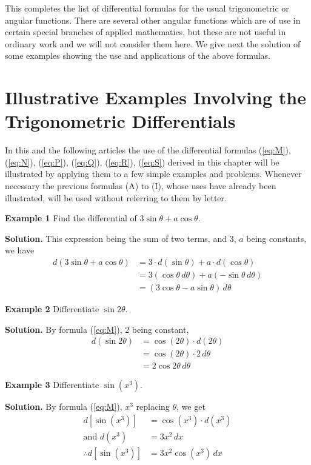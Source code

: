 This completes the list of differential formulas for the usual trigonometric or angular functions. There are several other angular functions which are of use in certain special branches of applied mathematics, but these are not useful in ordinary work and we will not consider them here. We give next the solution of some examples showing the use and applications of the above formulas.

\section{Illustrative Examples Involving the Trigonometric Differentials}

In this and the following articles the use of the differential formulas (\eqref{eq:M}), (\eqref{eq:N}), (\eqref{eq:P}), (\eqref{eq:Q}), (\eqref{eq:R}), (\eqref{eq:S}) derived in this chapter will be illustrated by applying them to a few simple examples and problems. Whenever necessary the previous formulas (A) to (I), whose uses have already been illustrated, will be used without referring to them by letter.

\textbf{Example 1}
Find the differential of $3\sin\theta + a\cos\theta$.

\noindent\textbf{Solution.} This expression being the sum of two terms, and 3, $a$ being constants, we have
\begin{align*}
d(3\sin\theta + a\cos\theta) &= 3\cdot d(\sin\theta) + a\cdot d(\cos\theta) \\
&= 3(\cos\theta\,d\theta) + a(-\sin\theta\,d\theta) \\
&= (3\cos\theta - a\sin\theta)\,d\theta
\end{align*}

\textbf{Example 2}
Differentiate $\sin 2\theta$.

\noindent\textbf{Solution.} By formula (\eqref{eq:M}), 2 being constant,
\begin{align*}
d(\sin 2\theta) &= \cos(2\theta)\cdot d(2\theta) \\
&= \cos(2\theta)\cdot 2\,d\theta \\
&= 2\cos 2\theta\,d\theta
\end{align*}

\textbf{Example 3}
Differentiate $\sin(x^3)$.

\noindent\textbf{Solution.} By formula (\eqref{eq:M}), $x^3$ replacing $\theta$, we get
\begin{align*}
d[\sin(x^3)] &= \cos(x^3)\cdot d(x^3) \\
\text{and } d(x^3) &= 3x^2\,dx \\
\therefore d[\sin(x^3)] &= 3x^2\cos(x^3)\,dx
\end{align*}

